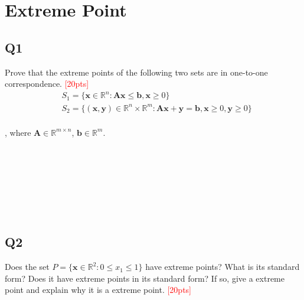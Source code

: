 \documentclass[10pt]{article}
\begin{document}
\newpage

\section{Extreme Point}
\subsection{Q1}
Prove that the extreme points of the following two sets are in one-to-one correspondence.
\textcolor{red}{[20pts]}
\begin{equation}
	\begin{aligned}
		& S_{1} = \{ \bm{x} \in \mathbb{R}^{n} : \bm{Ax} \leq \bm{b}, \bm{x} \geq 0 \} \\
		& S_{2} = \{ \bm{(x, y)} \in \mathbb{R}^{n} \times \mathbb{R}^{m} : \bm{Ax} + \bm{y} = \bm{b}, \bm{x} \geq 0, \bm{y} \geq 0 \} \\
	\end{aligned}
\end{equation}

, where $\bm{A} \in \mathbb{R}^{m \times n}$, $\bm{b} \in \mathbb{R}^{m}$.

~\\
~\\
~\\
~\\
~\\
~\\

\newpage
\subsection{Q2}
Does the set $P = \{ \bm{x} \in \mathbb{R}^{2} : 0 \leq x_{1} \leq 1 \}$ have extreme points? What is its standard form? Does it have extreme points in its standard form? If so, give a extreme point and explain why it is a extreme point.
\textcolor{red}{[20pts]}
\end{document}
